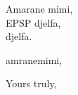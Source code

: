 \documentclass[letterpaper]{letter}
\date{03/05/1970}
\begin{document}
  \begin{letter}
  {
      Amarane mimi,\\
      EPSP djelfa,\\
      djelfa.
  }
    \opening{amranemimi,}%
     \lipsum[1-1]%
    \closing{Yours truly,}%
  
  \end{letter}
  
\end{document}
